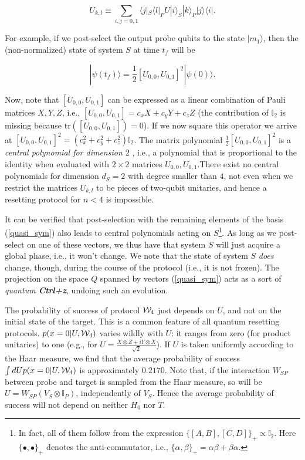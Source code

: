 \documentclass[twocolumn,prx,aps,longbibliography]{revtex4-1}
\def\be{\begin{equation}}
\def\ee{\end{equation}}
\def\id{{\mathbb I}}
\def\tr{\mbox{tr}}
\def\bra#1{\langle#1|} \def\ket#1{|#1\rangle}
\def\id{{\mathbb I}}
\begin{document}
\be
U_{k,l}\equiv\sum_{i,j=0,1}\bra{j}_S\bra{l}_PU\ket{i}_S\ket{k}_P\ket{j}\bra{i}.
\label{partU}
\ee

\noindent For example, if we post-select the output probe qubits to the state $\ket{m_1}$, then the (non-normalized) state of system $S$ at time $t_f$ will be

\be
\ket{\psi(t_f)}=\frac{1}{2}[U_{0,0},U_{0,1}]^2\ket{\psi(0)}.
\ee

Now, note that $[U_{0,0},U_{0,1}]$ can be expressed as a linear combination of Pauli matrices $X,Y,Z$, i.e., $[U_{0,0},U_{0,1}]=c_xX+c_yY+c_zZ$ (the contribution of $\id_2$ is missing because $\tr([U_{0,0},U_{0,1}])=0$). If we now square this operator we arrive at $[U_{0,0},U_{0,1}]^2=(c^2_x+c^2_y+c^2_z)\id_2$. The matrix polynomial $\frac{1}{2}[U_{0,0},U_{0,1}]^2$ is a \emph{central polynomial for dimension $2$} \cite{polyId}, i.e., a polynomial that is proportional to the identity when evaluated with $2\times 2$ matrices $U_{0,0},U_{0,1}$.There exist no central polynomials for dimension $d_S=2$ with degree smaller than $4$, not even when we restrict the matrices $U_{k,l}$ to be pieces of two-qubit unitaries, and hence a resetting protocol for $n<4$ is impossible.


It can be verified that post-selection with the remaining elements of the basis (\ref{quasi_sym}) also leads to central polynomials acting on $S$\footnote{In fact, all of them follow from the expression $\{[A,B],[C,D]\}_{+}\propto \id_2$. Here $\{\bullet,\bullet\}_{+}$ denotes the anti-commutator, i.e., $\{\alpha,\beta\}_{+}= \alpha\beta+\beta\alpha$.}. As long as we post-select on one of these vectors, we thus have that system $S$ will just acquire a global phase, i.e., it won't change. We note that the state of system $S$ \emph{does} change, though, during the course of the protocol (i.e., it is not frozen). The projection on the space $Q$ spanned by vectors (\ref{quasi_sym}) acts as a sort of \emph{quantum {\bf Ctrl+z}}, undoing such an evolution.


The probability of success of protocol ${\cal W}_4$ just depends on $U$, and not on the initial state of the target. This is a common feature of all quantum resetting protocols. $p(x=0|U,{\cal W}_4)$ varies wildly with $U$: it ranges from zero (for product unitaries) to one (e.g., for $U=\frac{X\otimes Z+iY\otimes X}{\sqrt{2}}$). If $U$ is taken uniformly according to the Haar measure, we find that the average probability of success $\int dU p(x=0|U,{\cal W}_4)$ is approximately $0.2170$. Note that, if the interaction $W_{SP}$ between probe and target is sampled from the Haar measure, so will be $U=W_{SP}(V_S\otimes\id_P)$, independently of $V_S$. Hence the average probability of success will not depend on neither $H_0$ nor $T$.
\end{document}
